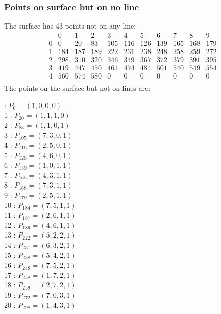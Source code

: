 \documentclass{article}
\begin{document}
{\subsubsection*{Points on surface but on no line}
The surface has 43 points not on any line:\\
$$
\begin{array}{r|*{10}{r}}
 & 0 & 1 & 2 & 3 & 4 & 5 & 6 & 7 & 8 & 9\\
\hline
0 & 0 & 20 & 83 & 105 & 116 & 126 & 139 & 165 & 168 & 179\\
1 & 184 & 187 & 189 & 222 & 231 & 238 & 248 & 258 & 259 & 272\\
2 & 298 & 310 & 320 & 346 & 349 & 367 & 372 & 379 & 391 & 395\\
3 & 419 & 447 & 450 & 461 & 474 & 484 & 501 & 540 & 549 & 554\\
4 & 560 & 574 & 580 & 0 & 0 & 0 & 0 & 0 & 0 & 0\\
\end{array}
$$
The points on the surface but not on lines are:\\
\begin{multicols}{2}
 : $P_{0}=( 1, 0, 0, 0 )$\\
1 : $P_{20}=( 1, 1, 1, 0 )$\\
2 : $P_{83}=( 1, 1, 0, 1 )$\\
3 : $P_{105}=( 7, 3, 0, 1 )$\\
4 : $P_{116}=( 2, 5, 0, 1 )$\\
5 : $P_{126}=( 4, 6, 0, 1 )$\\
6 : $P_{139}=( 1, 0, 1, 1 )$\\
7 : $P_{165}=( 4, 3, 1, 1 )$\\
8 : $P_{168}=( 7, 3, 1, 1 )$\\
9 : $P_{179}=( 2, 5, 1, 1 )$\\
10 : $P_{184}=( 7, 5, 1, 1 )$\\
11 : $P_{187}=( 2, 6, 1, 1 )$\\
12 : $P_{189}=( 4, 6, 1, 1 )$\\
13 : $P_{222}=( 5, 2, 2, 1 )$\\
14 : $P_{231}=( 6, 3, 2, 1 )$\\
15 : $P_{238}=( 5, 4, 2, 1 )$\\
16 : $P_{248}=( 7, 5, 2, 1 )$\\
17 : $P_{258}=( 1, 7, 2, 1 )$\\
18 : $P_{259}=( 2, 7, 2, 1 )$\\
19 : $P_{272}=( 7, 0, 3, 1 )$\\
20 : $P_{298}=( 1, 4, 3, 1 )$\\

\end{multicols}}
\end{document}
